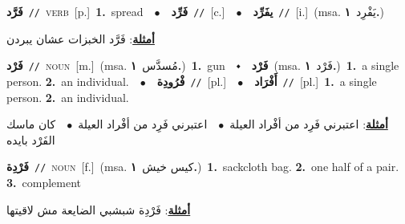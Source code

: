 \documentclass[10pt,a4paper,twoside]{article} %
\begin{document}
\begin{multicols}{2}
{\setlength\topsep{0pt}\textbf{\foreignlanguage{arabic}{فَرَّد}}\ {\color{gray}\texttt{//}\color{black}}\ \textsc{verb}\ [p.]\ \textbf{1.}~spread\ \ $\bullet$\ \ \setlength\topsep{0pt}\textbf{\foreignlanguage{arabic}{فَرِّد}}\ {\color{gray}\texttt{//}\color{black}}\ [c.]\ \ $\bullet$\ \ \setlength\topsep{0pt}\textbf{\foreignlanguage{arabic}{يفَرِّد}}\ {\color{gray}\texttt{//}\color{black}}\ [i.]\ \color{gray}(msa. \foreignlanguage{arabic}{يَفْرِد}~\foreignlanguage{arabic}{\textbf{١.}})\color{black}\  \begin{flushright}\color{gray}\foreignlanguage{arabic}{\textbf{\underline{\foreignlanguage{arabic}{أمثلة}}}: فَرَّد الخبزات عشان يبردن}\end{flushright}\color{black}} \vspace{2mm}

{\setlength\topsep{0pt}\textbf{\foreignlanguage{arabic}{فَرْد}}\ {\color{gray}\texttt{//}\color{black}}\ \textsc{noun}\ [m.]\ \color{gray}(msa. \foreignlanguage{arabic}{مُسدَّس}~\foreignlanguage{arabic}{\textbf{١.}})\color{black}\ \textbf{1.}~gun\ \ $\smblkdiamond$\ \ \setlength\topsep{0pt}\textbf{\foreignlanguage{arabic}{فَرْد}}\ \color{gray}(msa. \foreignlanguage{arabic}{فَرْد}~\foreignlanguage{arabic}{\textbf{١.}})\color{black}\ \textbf{1.}~a single person.  \textbf{2.}~an individual.\ \ $\bullet$\ \ \setlength\topsep{0pt}\textbf{\foreignlanguage{arabic}{فْرُودِة}}\ {\color{gray}\texttt{//}\color{black}}\ [pl.]\ \ $\bullet$\ \ \setlength\topsep{0pt}\textbf{\foreignlanguage{arabic}{أَفْرَاد}}\ {\color{gray}\texttt{//}\color{black}}\ [pl.]\ \textbf{1.}~a single person.  \textbf{2.}~an individual.\  \begin{flushright}\color{gray}\foreignlanguage{arabic}{\textbf{\underline{\foreignlanguage{arabic}{أمثلة}}}: اعتبرني فَرِد من أفْراد العيلة\ $\bullet$\ \  اعتبرني فَرِد من أفْراد العيلة\ $\bullet$\ \  كان ماسك الفَرْد بايده}\end{flushright}\color{black}} \vspace{2mm}

{\setlength\topsep{0pt}\textbf{\foreignlanguage{arabic}{فَرْدِة}}\ {\color{gray}\texttt{//}\color{black}}\ \textsc{noun}\ [f.]\ \color{gray}(msa. \foreignlanguage{arabic}{كيس خيش}~\foreignlanguage{arabic}{\textbf{١.}})\color{black}\ \textbf{1.}~sackcloth bag.  \textbf{2.}~one half of a pair.  \textbf{3.}~complement\  \begin{flushright}\color{gray}\foreignlanguage{arabic}{\textbf{\underline{\foreignlanguage{arabic}{أمثلة}}}: فَرْدِة شبشبي الضايعة مش لاقيتها}\end{flushright}\color{black}} \vspace{2mm}


\end{multicols}
\end{document}
